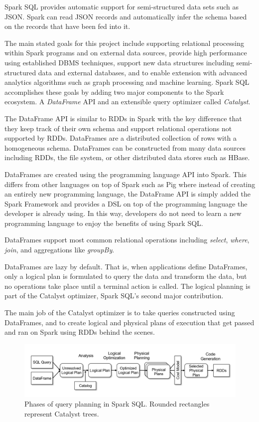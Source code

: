 \documentclass[]{article}
\begin{document}
Spark SQL provides automatic support for semi-structured data sets such as JSON. Spark can read JSON records and automatically infer the schema based on the records that have been fed into it.

The main stated goals for this project include supporting relational processing within Spark programs and on external data sources, provide high performance using established DBMS techniques, support new data structures including semi-structured data and external databases, and to enable extension with advanced analytics algorithms such as graph processing and machine learning. Spark SQL accomplishes these goals by adding two major components to the Spark ecosystem. A \textit{DataFrame} API and an extensible query optimizer called \textit{Catalyst}.

The DataFrame API is similar to RDDs in Spark with the key difference that they keep track of their own schema and support relational operations not supported by RDDs. DataFrames are a distributed collection of rows with a homogeneous schema. DataFrames can be constructed from many data sources including RDDs, the file system, or other distributed data stores such as HBase. 

DataFrames are created using the programming language API into Spark. This differs from other languages on top of Spark such as Pig where instead of creating an entirely new programming language, the DataFrame API is simply added the Spark Framework and provides a DSL on top of the programming language the developer is already using. In this way, developers do not need to learn a new programming language to enjoy the benefits of using Spark SQL.

DataFrames support most common relational operations including \textit{select}, \textit{where}, \textit{join}, and aggregations like \textit{groupBy}.

DataFrames are lazy by default. That is, when applications define DataFrames, only a logical plan is formulated to query the data and transform the data, but no operations take place until a terminal action is called. The logical planning is part of the Catalyst optimizer, Spark SQL's second major contribution.

The main job of the Catalyst optimizer is to take queries constructed using DataFrames, and to create logical and physical plans of execution that get passed and ran on Spark using RDDs behind the scenes.

\begin{figure}
    \centering
    \includegraphics[width=0.9\linewidth]{img/sparksql}
    \caption[Phases of query planning in Spark SQL.]{Phases of query planning in Spark SQL. Rounded rectangles represent Catalyst trees. \cite{armbrust2015spark}}
    \label{fig:sparksql}
\end{figure}
\end{document}
